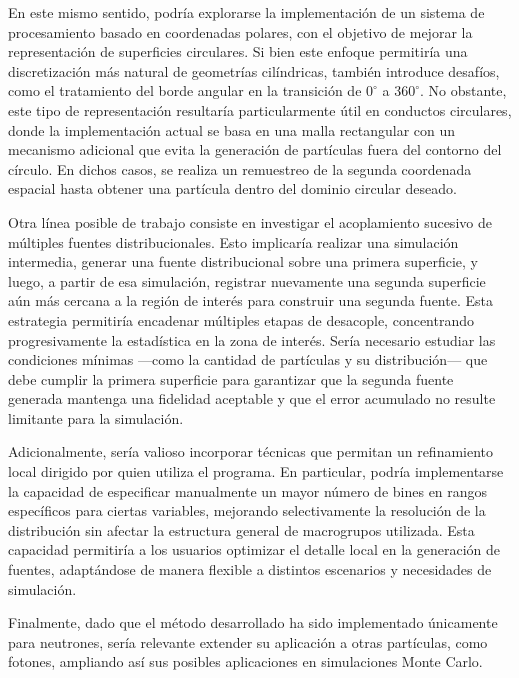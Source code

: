 En este mismo sentido, podría explorarse la implementación de un sistema de procesamiento basado en coordenadas polares, con el objetivo de mejorar la representación de superficies circulares. Si bien este enfoque permitiría una discretización más natural de geometrías cilíndricas, también introduce desafíos, como el tratamiento del borde angular en la transición de $0^\circ$ a $360^\circ$. No obstante, este tipo de representación resultaría particularmente útil en conductos circulares, donde la implementación actual se basa en una malla rectangular con un mecanismo adicional que evita la generación de partículas fuera del contorno del círculo. En dichos casos, se realiza un remuestreo de la segunda coordenada espacial hasta obtener una partícula dentro del dominio circular deseado.

Otra línea posible de trabajo consiste en investigar el acoplamiento sucesivo de múltiples fuentes distribucionales. Esto implicaría realizar una simulación intermedia, generar una fuente distribucional sobre una primera superficie, y luego, a partir de esa simulación, registrar nuevamente una segunda superficie aún más cercana a la región de interés para construir una segunda fuente. Esta estrategia permitiría encadenar múltiples etapas de desacople, concentrando progresivamente la estadística en la zona de interés. Sería necesario estudiar las condiciones mínimas —como la cantidad de partículas y su distribución— que debe cumplir la primera superficie para garantizar que la segunda fuente generada mantenga una fidelidad aceptable y que el error acumulado no resulte limitante para la simulación.

Adicionalmente, sería valioso incorporar técnicas que permitan un refinamiento local dirigido por quien utiliza el programa. En particular, podría implementarse la capacidad de especificar manualmente un mayor número de bines en rangos específicos para ciertas variables, mejorando selectivamente la resolución de la distribución sin afectar la estructura general de macrogrupos utilizada. Esta capacidad permitiría a los usuarios optimizar el detalle local en la generación de fuentes, adaptándose de manera flexible a distintos escenarios y necesidades de simulación.

Finalmente, dado que el método desarrollado ha sido implementado únicamente para neutrones, sería relevante extender su aplicación a otras partículas, como fotones, ampliando así sus posibles aplicaciones en simulaciones Monte Carlo.